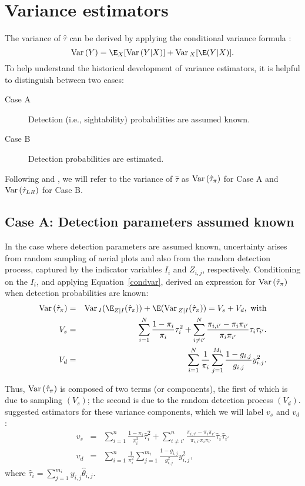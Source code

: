 \documentclass[nojss]{jss}
\def\VAR{{\rm Var}\,}
\begin{document}
\section{Variance estimators}
The variance of $\hat{\tau}$ can be derived by applying the
 conditional variance formula  \citep{Casella1990}:
\begin{equation}
\label{condvar} \VAR(Y)=\E_{X}[\VAR(Y|X)]+\VAR_{X}[\E(Y|X)] .
\end{equation}
 To help understand the historical development of variance
estimators, it is helpful to distinguish between two cases:

\begin{description}
\item [Case A] Detection (i.e., sightability) probabilities are assumed known.
\item [Case B] Detection probabilities are estimated.
\end{description}

Following \citet{SS1989} and \citet{Wong1996}, we will refer to the
variance of $\hat{\tau}$ as $\VAR(\hat{\tau}_{\pi})$ for Case A and
$\VAR(\hat{\tau}_{LR})$ for Case B.

\subsection{Case A:  Detection parameters assumed known}
In the case where detection parameters are assumed known,
uncertainty arises from random sampling of aerial plots and also
from the random detection process, captured by the indicator
variables $I_{i}$ and $Z_{i,j}$, respectively. Conditioning on the
$I_{i}$, and applying Equation~\ref{condvar}, \citet{SS1989} derived
an expression for $\VAR(\hat{\tau}_{\pi})$ when detection
probabilities are known:
\begin{eqnarray}
\VAR(\hat{\tau}_{\pi})& = & \VAR_{I}(\E_{Z|I}(\hat{\tau}_{\pi})) + \E(\VAR_{Z|I}(\hat{\tau}_{\pi})) =  V_{s}+V_{d}, \mbox{ with} \nonumber \\
\label{SSvar} V_{s} & = &  \sum_{i=1}^{N}\frac{1-\pi_{i}}{\pi_{i}}\tau_{i}^{2}+\sum_{i\neq i'}^{N}\frac{\pi_{i,i'}-\pi_{i}\pi_{i'}}{\pi_{i}\pi_{i'}}\tau_{i}\tau_{i'}.\\
V_{d} & = &   \sum_{i=1}^{N}\frac{1}{\pi_{i}}\sum_{j=1}^{M_{i}}\frac{1-g_{i,j}}{g_{i,j}}y_{i,j}^2.
\end{eqnarray}

Thus, $\VAR(\hat{\tau}_{\pi})$ is  composed of two terms (or
components), the first of which is due to sampling $(V_{s})$;  the
second is due to the random detection process $(V_{d})$.
\citet{SS1989}  suggested estimators for these variance components,
which we will label $v_{s}$ and $v_{d}$:
\begin{eqnarray}
\label{vs} v_{s} & = & \sum_{i=1}^{n}\frac{1-\pi_{i}}{\pi_{i}^{2}}\hat{\tau}_{i}^{2}+\sum_{i\neq i'}^{n}\frac{\pi_{i,i'}-\pi_{i}\pi_{i'}}{\pi_{i,i'}\pi_{i}\pi_{i'}}\hat{\tau}_{i}\hat{\tau}_{i'} \\
\label{vd} v_{d} & = &
\sum_{i=1}^{n}\frac{1}{\pi_{i}^{2}}\sum_{j=1}^{m_{i}}\frac{1-g_{i,j}}{g_{i,j}^{2}}y_{i,j}^2,
\end{eqnarray}
where $\hat{\tau}_{i}=\sum_{j=1}^{m_{i}}y_{i,j}\hat{\theta}_{i,j}$.
\end{document}
